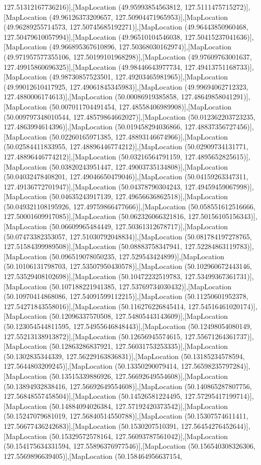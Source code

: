 127.51312167736216)],[MapLocation (49.95993854563812, 127.5111475715272)],[MapLocation (49.96126373209657, 127.50904471965953)],[MapLocation (49.96289255714573, 127.50745685192271)],[MapLocation (49.96443850960468, 127.50479610057994)],[MapLocation (49.96510104546038, 127.50415237041636)],[MapLocation (49.966895367610896, 127.50368030162974)],[MapLocation (49.971957577355106, 127.50199101968298)],[MapLocation (49.97609763001637, 127.49915860696325)],[MapLocation (49.98446643977734, 127.49413751168733)],[MapLocation (49.98730857523501, 127.49203465981965)],[MapLocation (49.99012610417925, 127.49061845345983)],[MapLocation (49.99694062712323, 127.4880006174613)],[MapLocation (50.00086919385858, 127.48649858041291)],[MapLocation (50.007011704491454, 127.48558406989908)],[MapLocation (50.009797348010544, 127.48579864662027)],[MapLocation (50.012362203723235, 127.4863994614396)],[MapLocation (50.019458294036866, 127.48837356727456)],[MapLocation (50.02260165971385, 127.48893146674966)],[MapLocation (50.02584411833955, 127.48896446774212)],[MapLocation (50.02909734131771, 127.48896446774212)],[MapLocation (50.03216564791159, 127.4895652825615)],[MapLocation (50.03820243951447, 127.49003735134808)],[MapLocation (50.04032478408201, 127.49046650479046)],[MapLocation (50.04159263347311, 127.49136772701947)],[MapLocation (50.04378790304243, 127.49459459067998)],[MapLocation (50.04635243917139, 127.49656636862518)],[MapLocation (50.049321108195926, 127.49759866477666)],[MapLocation (50.058551612516666, 127.50001609917085)],[MapLocation (50.062326066321816, 127.50156105156343)],[MapLocation (50.06609965484449, 127.50361312678717)],[MapLocation (50.07473382353057, 127.51030792048834)],[MapLocation (50.081784197278765, 127.51584399989508)],[MapLocation (50.08883758347941, 127.52284863119783)],[MapLocation (50.096519078050235, 127.529543424899)],[MapLocation (50.10106131798703, 127.53507950430578)],[MapLocation (50.102960672443146, 127.53529408102698)],[MapLocation (50.10472232519783, 127.53499367361731)],[MapLocation (50.107188221941385, 127.53769734030432)],[MapLocation (50.10970414868086, 127.54091599112215)],[MapLocation (50.11250601952378, 127.54271843558016)],[MapLocation (50.116276226845414, 127.54516461020174)],[MapLocation (50.12096337570508, 127.54805443143609)],[MapLocation (50.123054544811595, 127.54955646848443)],[MapLocation (50.12498054080149, 127.55213138913872)],[MapLocation (50.12656945574615, 127.55671264361737)],[MapLocation (50.12863286837921, 127.56031753253335)],[MapLocation (50.1302835344339, 127.56229163836831)],[MapLocation (50.13185234578594, 127.5644803209245)],[MapLocation (50.13350290079414, 127.56598235797284)],[MapLocation (50.13515339886926, 127.56692649554608)],[MapLocation (50.13894932838416, 127.56692649554608)],[MapLocation (50.140865287807756, 127.56848557458504)],[MapLocation (50.14526581224495, 127.57295417199714)],[MapLocation (50.14884094026384, 127.57192420373542)],[MapLocation (50.15247079681019, 127.56840514550788)],[MapLocation (50.15307574611411, 127.56677436242683)],[MapLocation (50.1530207510391, 127.56454276452644)],[MapLocation (50.15329572578164, 127.56093787561042)],[MapLocation (50.154175634331594, 127.55896376977546)],[MapLocation (50.156540308326306, 127.5569896639405)],[MapLocation (50.158464956637154, 
